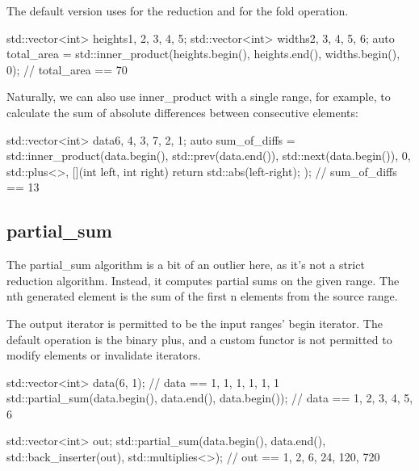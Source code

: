 The default version uses  for the reduction and  for the fold operation.

\begin{box-note}
\begin{cppcode}
std::vector<int> heights{1, 2, 3, 4, 5};
std::vector<int> widths{2, 3, 4, 5, 6};
auto total_area = std::inner_product(heights.begin(), heights.end(), widths.begin(), 0);
// total_area == 70
\end{cppcode}
\end{box-note}

Naturally, we can also use inner\_product with a single range, for example, to calculate the sum of absolute differences between consecutive elements:

\begin{box-note}
\begin{cppcode}
std::vector<int> data{6, 4, 3, 7, 2, 1};
auto sum_of_diffs = std::inner_product(data.begin(), std::prev(data.end()), 
                                       std::next(data.begin()), 
                                       0, std::plus<>{}, 
                                       [](int left, int right) { return std::abs(left-right); });
// sum_of_diffs == 13
\end{cppcode}
\end{box-note}

\subsection{partial\_sum}

The partial\_sum algorithm is a bit of an outlier here, as it’s not a strict reduction algorithm. Instead, it computes partial sums on the given range. The nth generated element is the sum of the first n elements from the source range.



The output iterator is permitted to be the input ranges’ begin iterator. The default operation is the binary plus, and a custom functor is not permitted to modify elements or invalidate iterators.

\begin{box-note}
\begin{cppcode}
std::vector<int> data(6, 1);
// data == {1, 1, 1, 1, 1, 1}
std::partial_sum(data.begin(), data.end(), data.begin());
// data == {1, 2, 3, 4, 5, 6}

std::vector<int> out;
std::partial_sum(data.begin(), data.end(), std::back_inserter(out), std::multiplies<>{});
// out == {1, 2, 6, 24, 120, 720}
\end{cppcode}
\end{box-note}
